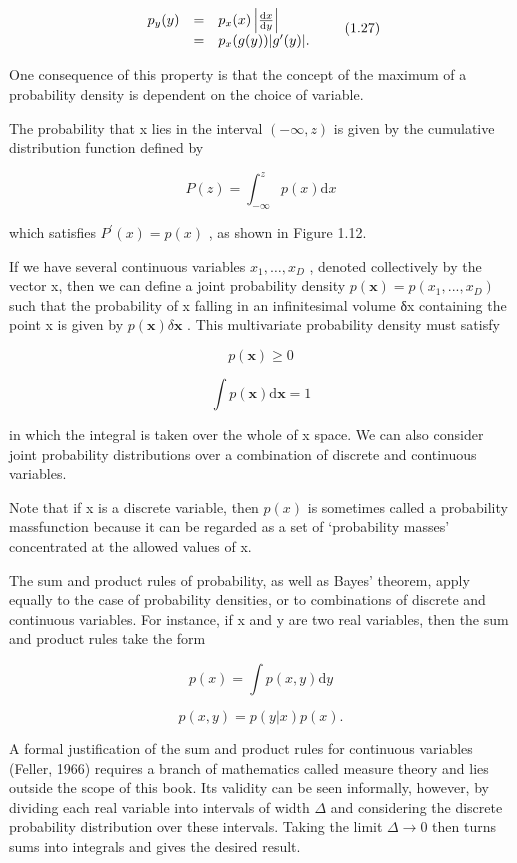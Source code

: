 \documentclass[
  10
]{article}
\begin{document}
\[
\begin{array}{r c l} p _ {y} (y) & = & p _ {x} (x) \left| \frac {\mathrm{d} x}{\mathrm{d} y} \right| \\ & = & p _ {x} (g (y))   | g ^ {\prime} (y) |  . \end{array}\tag{1.27}
\]

One consequence of this property is that the concept of the maximum of a
probability density is dependent on the choice of variable.

The probability that x lies in the interval \(( - \infty , z )\) is
given by the cumulative distribution function defined by

\[
P (z) = \int_ {- \infty} ^ {z} p (x) \mathrm{d} x\tag{1.28}
\]

which satisfies \(P ^ { \prime } ( x ) = p ( x )\) , as shown in Figure
1.12.

If we have several continuous variables
\(x _ { 1 } , \ldots , x _ { D }\) , denoted collectively by the vector
x, then we can define a joint probability density
\(p ( \mathbf { x } ) = p ( x _ { 1 } , . . . , x _ { D } )\) such that
the probability of x falling in an infinitesimal volume δx containing
the point x is given by \(p ( \mathbf { x } ) \delta \mathbf { x }\) .
This multivariate probability density must satisfy

\[
p (\mathbf {x}) \geqslant 0\tag{1.29}
\]

\[
\int p (\mathbf {x}) \mathrm{d} \mathbf {x} = 1\tag{1.30}
\]

in which the integral is taken over the whole of x space. We can also
consider joint probability distributions over a combination of discrete
and continuous variables.

Note that if x is a discrete variable, then \(p ( x )\) is sometimes
called a probability massfunction because it can be regarded as a set of
`probability masses' concentrated at the allowed values of x.

The sum and product rules of probability, as well as Bayes' theorem,
apply equally to the case of probability densities, or to combinations
of discrete and continuous variables. For instance, if x and y are two
real variables, then the sum and product rules take the form

\[
p (x) = \int p (x, y) \mathrm{d} y\tag{1.31}
\]

\[
p (x, y) = p (y | x) p (x).\tag{1.32}
\]

A formal justification of the sum and product rules for continuous
variables (Feller, 1966) requires a branch of mathematics called measure
theory and lies outside the scope of this book. Its validity can be seen
informally, however, by dividing each real variable into intervals of
width \(\Delta\) and considering the discrete probability distribution
over these intervals. Taking the limit \(\Delta \to 0\) then turns sums
into integrals and gives the desired result.
\end{document}
